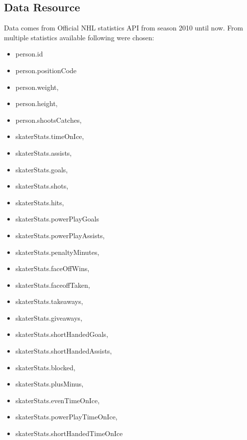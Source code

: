 		\subsection{Data Resource}
			Data comes from Official NHL statistics API from season 2010 until now. From multiple statistics available following were chosen:\\
			\begin{minipage}[t]{0.45\textwidth}
        \begin{itemize}
            \item person.id
            \item person.positionCode
            \item person.weight,
            \item person.height,
            \item person.shootsCatches,
            \item skaterStats.timeOnIce,
            \item skaterStats.assists,
            \item skaterStats.goals,
            \item skaterStats.shots,
            \item skaterStats.hits,
            \item skaterStats.powerPlayGoals
            \item skaterStats.powerPlayAssists,
        \end{itemize}
    \end{minipage}
    \begin{minipage}[t]{0.45\textwidth}
        \begin{itemize}
            \item skaterStats.penaltyMinutes,
            \item skaterStats.faceOffWins,
            \item skaterStats.faceoffTaken,
            \item skaterStats.takeaways,
            \item skaterStats.giveaways,
            \item skaterStats.shortHandedGoals,
            \item skaterStats.shortHandedAssists,
            \item skaterStats.blocked,
            \item skaterStats.plusMinus,
            \item skaterStats.evenTimeOnIce,
            \item skaterStats.powerPlayTimeOnIce,
            \item skaterStats.shortHandedTimeOnIce
        \end{itemize}
    \end{minipage} 
